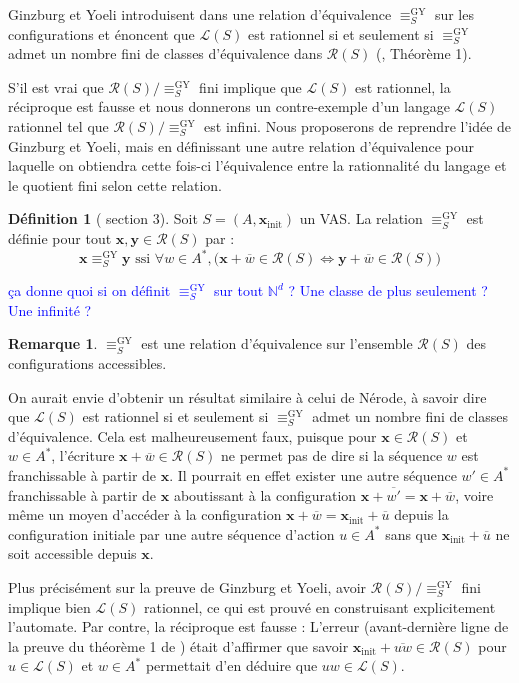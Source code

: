 \documentclass[a4paper,final]{article}
\theoremstyle{definition}
\newtheorem{Definition}[Theorem]{Définition}
\newtheorem*{Remark}{Remarque}
\newcommand{\alain}[1]{\textcolor{blue}{#1}}
\newcommand{\N}{\ensuremath{\mathbb{N}}}
\newcommand{\lang}{\ensuremath{\mathcal{L}}}
\newcommand{\reach}{\ensuremath{\mathcal{R}}}
\newcommand{\vect}[1]{\ensuremath{\mathbf{#1}}}
\newcommand{\relGY}{\ensuremath{\equiv^\text{GY}_S}}
\newcommand{\ssi}{\ensuremath{\text{ ssi }}}
\newcommand{\equivaut}{\ensuremath{\Leftrightarrow}}
\newcommand{\xinit}{\ensuremath{\vect{x}_\text{init}}}
\newcommand{\valeur}[1]{\ensuremath{\overline{#1}}}
\begin{document}
Ginzburg et Yoeli introduisent dans \cite{giyo80} une relation d'équivalence $\relGY$ sur les configurations et énoncent que $\lang(S)$ est rationnel si et seulement si $\relGY$ admet un nombre fini de classes d'équivalence dans $\reach(S)$ (\cite{giyo80}, Théorème 1).

S'il est vrai que $\reach(S)/\relGY$ fini implique que $\lang(S)$ est rationnel, la réciproque est fausse et nous donnerons un contre-exemple d'un langage $\lang(S)$ rationnel tel que $\reach(S)/\relGY$ est infini. 
Nous proposerons de reprendre l'idée de Ginzburg et Yoeli,
mais en définissant une autre relation d'équivalence pour laquelle on obtiendra cette fois-ci l'équivalence entre la rationnalité du langage et le quotient fini selon cette relation.

\begin{Definition}[\cite{giyo80} section 3]
Soit $S=(A,\xinit)$ un VAS. La relation $\relGY$ est définie pour tout $\vect{x},\vect{y} \in\reach(S)$ par : 
$$\vect{x}\relGY\vect{y} \ssi \forall w\in A^\ast, \big( \vect{x} +\valeur{w}\in\reach(S) \equivaut \vect{y} +\valeur{w}\in\reach(S) \big)$$
\end{Definition}
\alain{ça donne quoi si on définit $\relGY$ sur tout $\N^d$ ? Une classe de plus seulement ? Une infinité ?}

\begin{Remark}
$\relGY$ est une relation d'équivalence sur l'ensemble $\reach(S)$ des configurations accessibles.
\end{Remark}

On aurait envie d'obtenir un résultat similaire à celui de Nérode, à savoir dire que $\lang(S)$ est rationnel si et seulement si $\relGY$ admet un nombre fini de classes d'équivalence.
Cela est malheureusement faux, puisque pour $\vect{x}\in\reach(S)$ et $w\in A^\ast$, l'écriture $\vect{x} +\valeur{w}\in\reach(S)$ ne permet pas de dire si la séquence $w$ est franchissable à partir de $\vect{x}$.
Il pourrait en effet exister une autre séquence $w'\in A^\ast$ franchissable à partir de $\vect{x}$ aboutissant à la configuration $\vect{x} +\valeur{w'} = \vect{x} +\valeur{w}$,
voire même un moyen d'accéder à la configuration $\vect{x} +\valeur{w} = \xinit +\valeur{u}$ depuis la configuration initiale par une autre séquence d'action $u\in A^\ast$ sans que $\xinit +\valeur{u}$ ne soit accessible depuis $\vect{x}$.

Plus précisément sur la preuve de Ginzburg et Yoeli, 
avoir $\reach(S)/\relGY$ fini implique bien $\lang(S)$ rationnel, ce qui est prouvé en construisant explicitement l'automate.
Par contre, la réciproque est fausse : 
L'erreur (avant-dernière ligne de la preuve du théorème 1 de \cite{giyo80}) était d'affirmer que savoir $\xinit +\valeur{uw}\in\reach(S)$ pour $u\in\lang(S)$ et $w\in A^\ast$ permettait d'en déduire que $uw\in\lang(S)$.
\end{document}
